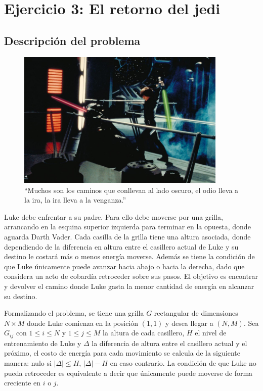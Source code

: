 \section{Ejercicio 3: El retorno del jedi}

    \subsection{Descripción del problema}

    \begin{figure}[ht]
        \begin{center}
            \includegraphics[width=10cm]{imagenes/el_retorno_del_jedi.jpg}
			\caption*{``Muchos son los caminos que conllevan al lado oscuro, el
			odio lleva a la ira, la ira lleva a la venganza.''}
        \end{center}
    \end{figure}

	Luke debe enfrentar a su padre. Para ello debe moverse por una grilla,
	arrancando en la esquina superior izquierda para terminar en la opuesta,
	donde aguarda Darth Vader. Cada casilla de la grilla tiene una altura
	asociada, donde dependiendo de la diferencia en altura entre el casillero
	actual de Luke y su destino le costará más o menos energía moverse. Además
	se tiene la condición de que Luke únicamente puede avanzar hacia abajo o
	hacia la derecha, dado que considera un acto de cobardía retroceder sobre
	sus pasos. El objetivo es encontrar y devolver el camino donde Luke gasta la
	menor cantidad de energía en alcanzar su destino.

	Formalizando el problema, se tiene una grilla $G$ rectangular de dimensiones $N \times
	M$ donde Luke comienza en la posición $(1, 1)$ y desea llegar a $(N, M)$.
	Sea $G_{ij}$ con $1 \leq i \leq N$ y $1 \leq j \leq M$ la altura de cada
	casillero, $H$ el nivel de entrenamiento de Luke y $\Delta$ la
	diferencia de altura entre el casillero actual y el próximo, el costo de
	energía para cada movimiento se calcula de la siguiente manera: nulo si $|\Delta|
	\leq H$, $|\Delta| - H$ en caso contrario. La condición de que Luke no pueda
	retroceder es equivalente a decir que únicamente puede moverse de forma
	creciente en $i$ o $j$.

